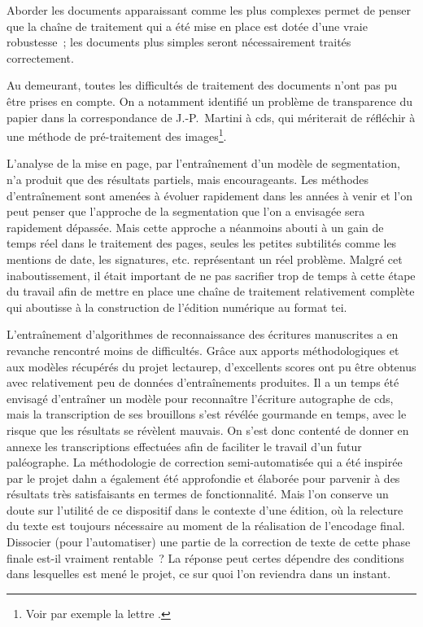 \documentclass[a4paper,12pt,twoside]{book}
\begin{document}
		Aborder les documents apparaissant comme les plus complexes permet de penser que la chaîne de traitement qui a été mise en place est dotée d'une vraie robustesse~; les documents plus simples seront nécessairement traités correctement.
		
		Au demeurant, toutes les difficultés de traitement des documents n'ont pas pu être prises en compte. On a notamment identifié un problème de transparence du papier dans la correspondance de J.-P.~Martini à \gls{cds}, qui mériterait de réfléchir à une méthode de pré-traitement des images\footnote{Voir par exemple la lettre \cite{CdS19054056}.}.
		
		L'analyse de la mise en page, par l'entraînement d'un modèle de \gls{segmentation}, n'a produit que des résultats partiels, mais encourageants. Les méthodes d'entraînement sont amenées à évoluer rapidement dans les années à venir et l'on peut penser que l'approche de la \gls{segmentation} que l'on a envisagée sera rapidement dépassée. Mais cette approche a néanmoins abouti à un gain de temps réel dans le traitement des pages, seules les petites subtilités comme les mentions de date, les signatures, etc. représentant un réel problème. Malgré cet inaboutissement, il était important de ne pas sacrifier trop de temps à cette étape du travail afin de mettre en place une chaîne de traitement relativement complète qui aboutisse à la construction de l'édition numérique au format \gls{tei}.
		
		L'entraînement d'algorithmes de reconnaissance des écritures manuscrites a en revanche rencontré moins de difficultés. Grâce aux apports méthodologiques et aux modèles récupérés du projet \gls{lectaurep}, d'excellents scores ont pu être obtenus avec relativement peu de données d'entraînements produites.
		Il a un temps été envisagé d'entraîner un modèle pour reconnaître l'écriture autographe de \gls{cds}, mais la transcription de ses brouillons s'est révélée gourmande en temps, avec le risque que les résultats se révèlent mauvais. On s'est donc contenté de donner en annexe les transcriptions effectuées afin de faciliter le travail d'un futur paléographe.
		La méthodologie de correction semi-automatisée qui a été inspirée par le projet \gls{dahn} a également été approfondie et élaborée pour parvenir à des résultats très satisfaisants en termes de fonctionnalité. Mais l'on conserve un doute sur l'utilité de ce dispositif dans le contexte d'une édition, où la relecture du texte est toujours nécessaire au moment de la réalisation de l'encodage final. Dissocier (pour l'automatiser) une partie de la correction de texte de cette phase finale est-il vraiment rentable~? La réponse peut certes dépendre des conditions dans lesquelles est mené le projet, ce sur quoi l'on reviendra dans un instant.
		
\end{document}
